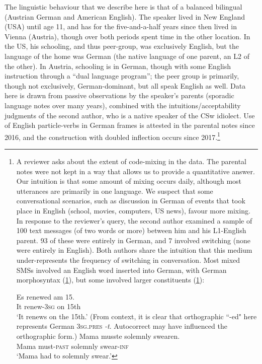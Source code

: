 \documentclass[output=paper]{langscibook}
\begin{document}
The linguistic behaviour that we describe here is that of a balanced bilingual (Austrian German and American English). The speaker lived in New England (USA) until age 11, and has for the five-and-a-half years since then lived in Vienna (Austria), though over both periods spent time in the other location. In the US, his schooling, and thus peer-group, was exclusively English, but the language of the home was German (the native language of one parent, an  L2 of the other). In Austria, schooling is in German, though with some English instruction through a ``dual language program''; the peer group is primarily, though not exclusively, German-dominant, but all speak English as well. Data here is drawn from passive observations by the speaker's parents (sporadic language notes over many years), combined with the intuitions/acceptability judgments of the second author, who is a native speaker of the CSw idiolect. Use of English particle-verbs in German frames is attested in the parental notes since 2016, and the construction with doubled inflection occurs since 2017.\footnote{A reviewer asks about the extent of code-mixing in the data. The parental notes were not kept in a way that allows us to provide a quantitative answer. Our intuition is that some amount of mixing occurs daily, although most utterances are primarily in one language. We suspect that some conversational scenarios, such as discussion in German of events that took place in English (school, movies, computers, US news), favour more mixing. In response to the reviewer's query, the second author examined a sample of 100 text messages (of two words or more) between him and his L1-English parent. 93 of these were entirely in German, and 7 involved switching (none were entirely in English). Both authors share the intuition that this medium under-represents the frequency of switching in conversation. Most mixed SMSs involved an English word inserted into German, with German morphosyntax (\ref{renewed}), but some involved larger constituents (\ref{solemnly}): 

\ea\gll \label{renewed}Es renewed am 15.\\
It renew-{\textsc{3sg}} on 15th\\
\glt `It renews on the 15th.' (From context, it is clear that orthographic ``-ed" here represents German \textsc{3sg.pres} \textit{-t}. Autocorrect may have influenced the orthographic form.)
\ex\gll \label{solemnly}Mama musste solemnly swearen.\\
Mama must-{\textsc{past}} solemnly swear-\textsc{inf}\\
\glt `Mama had to solemnly swear.'
\z 
} 
\end{document}
